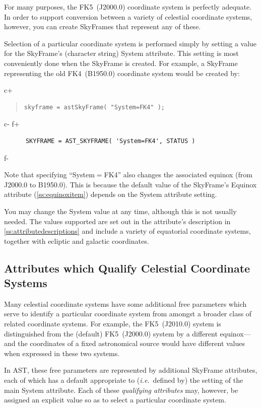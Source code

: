 \documentclass[twoside,11pt]{article}
\newcommand{\appref}[1]{Appendix~\ref{#1}}
\newcommand{\secref}[1]{\S\ref{#1}}
\renewcommand{\appref}[1]{\ref{#1}}
\renewcommand{\secref}[1]{\ref{#1}}
\begin{document}
For many purposes, the FK5~(J2000.0) coordinate system is perfectly
adequate. In order to support conversion between a variety of
celestial coordinate systems, however, you can create SkyFrames that
represent any of these.

Selection of a particular coordinate system is performed simply by
setting a value for the SkyFrame's (character string) System
attribute. This setting is most conveniently done when the SkyFrame is
created. For example, a SkyFrame representing the old FK4~(B1950.0)
coordinate system would be created by:

c+
\begin{quote}
\small
\begin{verbatim}
skyframe = astSkyFrame( "System=FK4" );
\end{verbatim}
\normalsize
\end{quote}
c-
f+
\small
\begin{verbatim}
      SKYFRAME = AST_SKYFRAME( 'System=FK4', STATUS )
\end{verbatim}
\normalsize
f-

Note that specifying ``System$=$FK4'' also changes the associated
equinox (from J2000.0 to B1950.0). This is because the default value
of the SkyFrame's Equinox attribute (\secref{ss:equinoxitem}) depends
on the System attribute setting.

You may change the System value at any time, although this is not
usually needed.  The values supported are set out in the attribute's
description in \appref{ss:attributedescriptions} and include a variety
of equatorial coordinate systems, together with ecliptic and galactic
coordinates.

\subsection{Attributes which Qualify Celestial Coordinate Systems}

Many celestial coordinate systems have some additional free parameters
which serve to identify a particular coordinate system from amongst a
broader class of related coordinate systems. For example, the
FK5~(J2010.0) system is distinguished from the (default) FK5~(J2000.0)
system by a different equinox---and the coordinates of a fixed
astronomical source would have different values when expressed in
these two systems.

In AST, these free parameters are represented by additional SkyFrame
attributes, each of which has a default appropriate to
({\em{i.e.}}\ defined by) the setting of the main System
attribute. Each of these {\em{qualifying attributes}} may, however, be
assigned an explicit value so as to select a particular coordinate
system.
\end{document}
